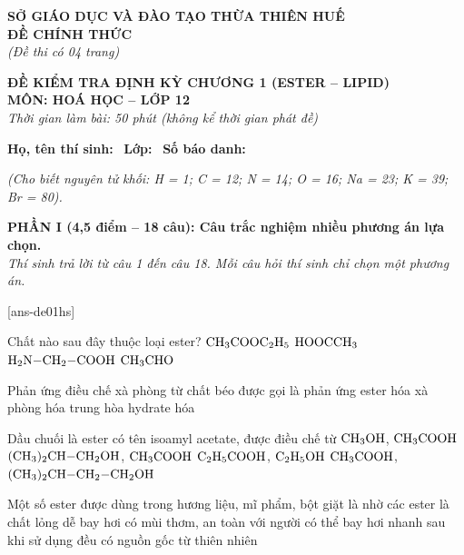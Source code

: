 \documentclass[12pt,a4paper]{article}
\begin{document}
\thispagestyle{firstpage}

\noindent
\begin{minipage}[t]{0.44\textwidth}
	\centering\fontsize{10pt}{12pt}\selectfont
	\textbf{SỞ GIÁO DỤC VÀ ĐÀO TẠO THỪA THIÊN HUẾ}\\
	\textbf{ĐỀ CHÍNH THỨC}\\
	\textit{(Đề thi có 04 trang)}
\end{minipage}\hfill
\begin{minipage}[t]{0.54\textwidth}
	\centering\small
	\textbf{ĐỀ KIỂM TRA ĐỊNH KỲ CHƯƠNG 1 (ESTER -- LIPID)}\\
	\textbf{MÔN: HOÁ HỌC -- LỚP 12}\\
	\textit{Thời gian làm bài: 50 phút (không kể thời gian phát đề)}\\
\end{minipage}

\smallskip
\noindent\hrulefill
\smallskip

\noindent\textbf{Họ, tên thí sinh:} \dotfill\ \textbf{Lớp:} \dotfill\ \textbf{Số báo danh:} \dotfill

\smallskip
\noindent\textit{(Cho biết nguyên tử khối: H = 1; C = 12; N = 14; O = 16; Na = 23; K = 39; Br = 80).}
\smallskip

\noindent
\textbf{PHẦN I (4,5 điểm -- 18 câu): Câu trắc nghiệm nhiều phương án lựa chọn.}\\
\textit{Thí sinh trả lời từ câu 1 đến câu 18. Mỗi câu hỏi thí sinh chỉ chọn một phương án.}

[ans-de01hs]

\begin{ex}
Chất nào sau đây thuộc loại ester?
\choice
{$\ce{CH3COOC2H5}$}
{$\ce{HOOCCH3}$}
{$\ce{H2N-CH2-COOH}$}
{$\ce{CH3CHO}$}
\loigiai{}
\end{ex}

\begin{ex}
Phản ứng điều chế xà phòng từ chất béo được gọi là phản ứng
\choice
{ester hóa}
{xà phòng hóa}
{trung hòa}
{hydrate hóa}
\loigiai{}
\end{ex}

\begin{ex}
Dầu chuối là ester có tên isoamyl acetate, được điều chế từ
\choice
{$\ce{CH3OH}$, $\ce{CH3COOH}$}
{$\ce{(CH3)2CH-CH2OH}$, $\ce{CH3COOH}$}
{$\ce{C2H5COOH}$, $\ce{C2H5OH}$}
{$\ce{CH3COOH}$, $\ce{(CH3)2CH-CH2-CH2OH}$}
\loigiai{}
\end{ex}

\begin{ex}
Một số ester được dùng trong hương liệu, mĩ phẩm, bột giặt là nhờ các ester
\choice
{là chất lỏng dễ bay hơi}
{có mùi thơm, an toàn với người}
{có thể bay hơi nhanh sau khi sử dụng}
{đều có nguồn gốc từ thiên nhiên}
\loigiai{}
\end{ex}
\end{document}
